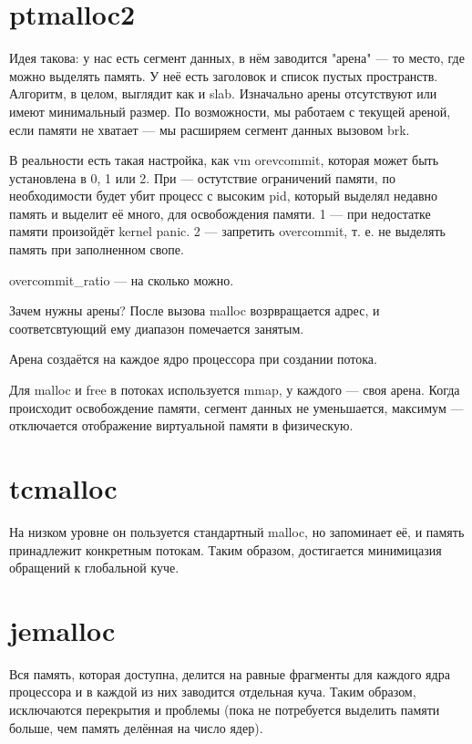 \documentclass[main]{subfiles}
\begin{document}
\section{ptmalloc2}
Идея такова: у нас есть сегмент данных, в нём заводится "арена" --- то место, где
можно выделять память. У неё есть заголовок и список пустых пространств.
Алгоритм, в целом, выглядит как и slab. Изначально арены отсутствуют
или имеют минимальный размер. По возможности, мы работаем с текущей ареной,
если памяти не хватает --- мы расширяем сегмент данных вызовом brk.

В реальности есть такая настройка, как vm orevcommit, которая может быть
установлена в 0, 1 или 2. При  --- остутствие ограничений памяти, по необходимости
будет убит процесс с высоким pid, который выделял недавно память и выделит её много,
для освобождения памяти. 1 --- при недостатке памяти произойдёт kernel panic.
2 --- запретить overcommit, т. е. не выделять память при заполненном свопе.

overcommit\_ratio --- на сколько можно.

Зачем нужны арены? После вызова malloc возрвращается адрес, и соответсвтующий
ему диапазон помечается занятым.

Арена создаётся на каждое ядро процессора при создании потока.

Для malloc и free в потоках используется mmap, у каждого --- своя арена.
Когда происходит освобождение памяти, сегмент данных не уменьшается, максимум ---
отключается отображение виртуальной памяти в физическую.

\section{tcmalloc}
На низком уровне он пользуется стандартный malloc, но запоминает её,
и память принадлежит конкретным потокам. Таким образом, достигается минимицазия
обращений к глобальной куче.

\section{jemalloc}
Вся память, которая доступна, делится на равные фрагменты для каждого ядра
процессора и в каждой из них заводится отдельная куча. Таким образом,
исключаются перекрытия и проблемы (пока не потребуется выделить памяти больше,
чем память делённая на число ядер).
\end{document}
